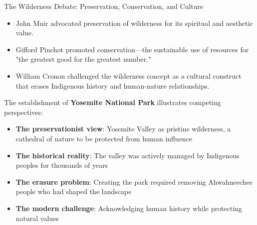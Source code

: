 \documentclass{beamer}
\begin{document}
	\begin{frame}{The Wilderness Debate: Preservation, Conservation, and Culture}
		\begin{itemize}
			\item John Muir advocated preservation of wilderness for its spiritual and aesthetic value.
			\item Gifford Pinchot promoted conservation—the sustainable use of resources for "the greatest good for the greatest number."
			\item William Cronon challenged the wilderness concept as a cultural construct that erases Indigenous history and human-nature relationships.
		\end{itemize}
		
		\begin{example}
			\scriptsize
			The establishment of \textbf{Yosemite National Park} illustrates competing perspectives:
			\begin{itemize}
				\item \textbf{The preservationist view}: Yosemite Valley as pristine wilderness, a cathedral of nature to be protected from human influence
				\item \textbf{The historical reality}: The valley was actively managed by Indigenous peoples for thousands of years
				\item \textbf{The erasure problem}: Creating the park required removing Ahwahneechee people who had shaped the landscape
				\item \textbf{The modern challenge}: Acknowledging human history while protecting natural values
			\end{itemize}
		\end{example}
	\end{frame}
	
\end{document}
